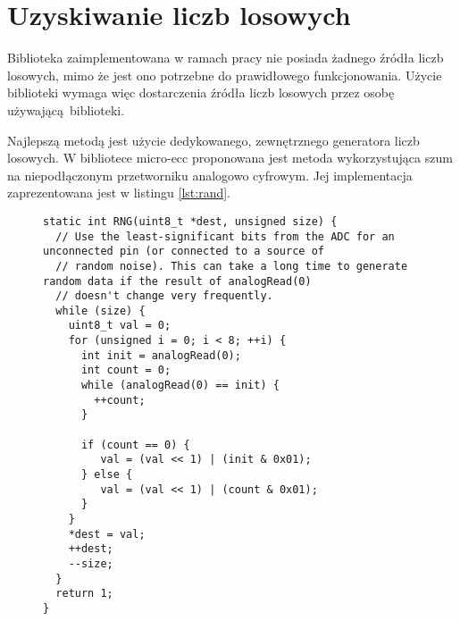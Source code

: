 \chapter{Uzyskiwanie liczb losowych}
\label{app:randgen}



Biblioteka zaimplementowana w ramach pracy nie posiada żadnego źródła liczb losowych, mimo że jest ono potrzebne do prawidłowego funkcjonowania. Użycie biblioteki wymaga więc dostarczenia źródła liczb losowych przez osobę używającą biblioteki.

Najlepszą metodą jest użycie dedykowanego, zewnętrznego generatora liczb losowych. W bibliotece micro-ecc proponowana jest metoda wykorzystująca szum na niepodłączonym przetworniku analogowo cyfrowym. Jej implementacja zaprezentowana jest w listingu \ref{lst:rand}.

\begin{figure}[!htb]
\begin{lstlisting}[caption={Generowanie liczb losowych w oparciu o wbudowany przetwornik cyfrowo-analogowy. Źródło: biblioteka micro-ecc},label={lst:rand}]
static int RNG(uint8_t *dest, unsigned size) {
  // Use the least-significant bits from the ADC for an unconnected pin (or connected to a source of 
  // random noise). This can take a long time to generate random data if the result of analogRead(0) 
  // doesn't change very frequently.
  while (size) {
    uint8_t val = 0;
    for (unsigned i = 0; i < 8; ++i) {
      int init = analogRead(0);
      int count = 0;
      while (analogRead(0) == init) {
        ++count;
      }
      
      if (count == 0) {
         val = (val << 1) | (init & 0x01);
      } else {
         val = (val << 1) | (count & 0x01);
      }
    }
    *dest = val;
    ++dest;
    --size;
  }
  return 1;
}
\end{lstlisting}
\end{figure}
